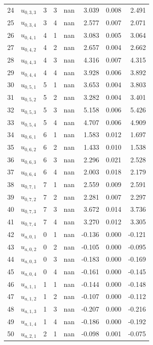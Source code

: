 \begin{tabular}{lllllrrr}
24 & $u_{0,3,3}$ & 3 & 3 & nan & 3.039 & 0.008 & 2.491 \\
25 & $u_{0,3,4}$ & 3 & 4 & nan & 2.577 & 0.007 & 2.071 \\
26 & $u_{0,4,1}$ & 4 & 1 & nan & 3.083 & 0.005 & 3.064 \\
27 & $u_{0,4,2}$ & 4 & 2 & nan & 2.657 & 0.004 & 2.662 \\
28 & $u_{0,4,3}$ & 4 & 3 & nan & 4.316 & 0.007 & 4.315 \\
29 & $u_{0,4,4}$ & 4 & 4 & nan & 3.928 & 0.006 & 3.892 \\
30 & $u_{0,5,1}$ & 5 & 1 & nan & 3.653 & 0.004 & 3.803 \\
31 & $u_{0,5,2}$ & 5 & 2 & nan & 3.282 & 0.004 & 3.401 \\
32 & $u_{0,5,3}$ & 5 & 3 & nan & 5.158 & 0.006 & 5.426 \\
33 & $u_{0,5,4}$ & 5 & 4 & nan & 4.707 & 0.006 & 4.909 \\
34 & $u_{0,6,1}$ & 6 & 1 & nan & 1.583 & 0.012 & 1.697 \\
35 & $u_{0,6,2}$ & 6 & 2 & nan & 1.433 & 0.010 & 1.538 \\
36 & $u_{0,6,3}$ & 6 & 3 & nan & 2.296 & 0.021 & 2.528 \\
37 & $u_{0,6,4}$ & 6 & 4 & nan & 2.003 & 0.018 & 2.179 \\
38 & $u_{0,7,1}$ & 7 & 1 & nan & 2.559 & 0.009 & 2.591 \\
39 & $u_{0,7,2}$ & 7 & 2 & nan & 2.281 & 0.007 & 2.297 \\
40 & $u_{0,7,3}$ & 7 & 3 & nan & 3.672 & 0.014 & 3.736 \\
41 & $u_{0,7,4}$ & 7 & 4 & nan & 3.270 & 0.012 & 3.305 \\
42 & $u_{a,0,1}$ & 0 & 1 & nan & -0.136 & 0.000 & -0.121 \\
43 & $u_{a,0,2}$ & 0 & 2 & nan & -0.105 & 0.000 & -0.095 \\
44 & $u_{a,0,3}$ & 0 & 3 & nan & -0.183 & 0.000 & -0.169 \\
45 & $u_{a,0,4}$ & 0 & 4 & nan & -0.161 & 0.000 & -0.145 \\
46 & $u_{a,1,1}$ & 1 & 1 & nan & -0.144 & 0.000 & -0.148 \\
47 & $u_{a,1,2}$ & 1 & 2 & nan & -0.107 & 0.000 & -0.112 \\
48 & $u_{a,1,3}$ & 1 & 3 & nan & -0.207 & 0.000 & -0.216 \\
49 & $u_{a,1,4}$ & 1 & 4 & nan & -0.186 & 0.000 & -0.192 \\
50 & $u_{a,2,1}$ & 2 & 1 & nan & -0.098 & 0.001 & -0.075 \\

\end{tabular}
